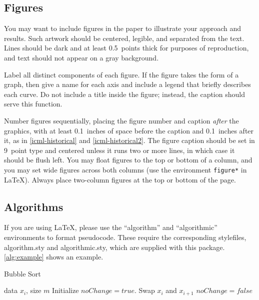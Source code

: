     \subsection{Figures}

    You may want to include figures in the paper to illustrate
    your approach and results. Such artwork should be centered,
    legible, and separated from the text. Lines should be dark and at
    least 0.5~points thick for purposes of reproduction, and text should
    not appear on a gray background.

    Label all distinct components of each figure. If the figure takes the
    form of a graph, then give a name for each axis and include a legend
    that briefly describes each curve. Do not include a title inside the
    figure; instead, the caption should serve this function.

    Number figures sequentially, placing the figure number and caption
    \emph{after} the graphics, with at least 0.1~inches of space before
    the caption and 0.1~inches after it, as in
    \cref{icml-historical} and \cref{icml-historical2}. The figure caption should be set 
    in 9~point type and centered unless it runs two or more lines, in which
    case it should be flush left. You may float figures to the top or
    bottom of a column, and you may set wide figures across both columns
    (use the environment \texttt{figure*} in \LaTeX). Always place
    two-column figures at the top or bottom of the page.


    \subsection{Algorithms}

    If you are using \LaTeX, please use the ``algorithm'' and ``algorithmic''
    environments to format pseudocode. These require
    the corresponding stylefiles, algorithm.sty and
    algorithmic.sty, which are supplied with this package.
    \cref{alg:example} shows an example.

        \begin{algorithm}[tb]
            \caption{Bubble Sort}
            \label{alg:example}
            \begin{algorithmic}
                 data $x_i$, size $m$
                \REPEAT
                \STATE Initialize $noChange = true$.
                \STATE Swap $x_i$ and $x_{i+1}$
                \STATE $noChange = false$
                \ENDIF
                \ENDFOR
            \end{algorithmic}
        \end{algorithm}


